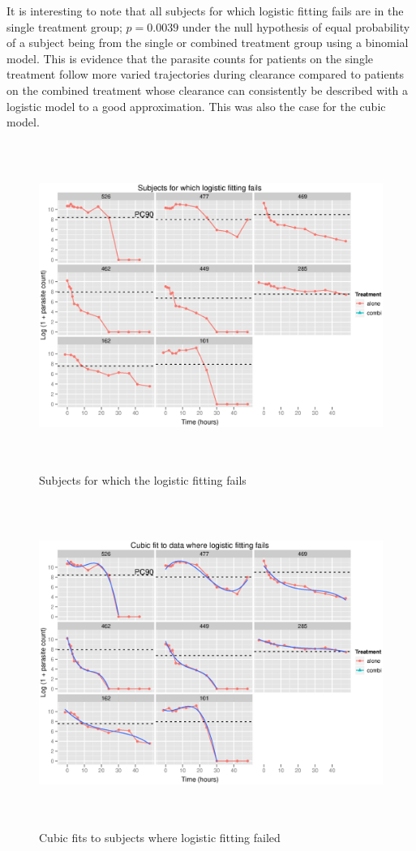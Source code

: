 It is interesting to note that all subjects for which logistic fitting fails are in the single treatment group; $p=0.0039$ under the null hypothesis of equal probability of a subject being from the single or combined treatment group using a binomial model. This is evidence that the parasite counts for patients on the single treatment follow more varied trajectories during clearance compared to patients on the combined treatment whose clearance can consistently be described with a logistic model to a good approximation. This was also the case for the cubic model.

\begin{figure}[h]
\includegraphics[height=4.2in]{failures.eps} 
\caption{Subjects for which the logistic fitting fails}\label{failures}
\end{figure}
\begin{figure}[h]
\includegraphics[height=4.2in]{failcubics.eps} 
\caption{Cubic fits to subjects where logistic fitting failed}\label{failcubics}
\end{figure}
\clearpage
